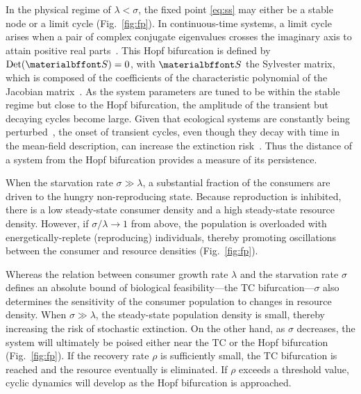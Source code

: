 \documentclass{pnastwo}
\begin{document}
\begin{article}
In the physical regime of $\lambda<\sigma$, the fixed point \eqref{eq:ss} may
either be a stable node or a limit cycle (Fig.~\ref{fig:fp}).  In
continuous-time systems, a limit cycle arises when a pair of complex
conjugate eigenvalues crosses the imaginary axis to attain positive real
parts~\cite{GuckHolmes}.  This Hopf bifurcation is defined by
${\rm Det}({\bf S}) = 0$, with $\bf S$ the Sylvester matrix, which is
composed of the coefficients of the characteristic polynomial of the Jacobian
matrix~\cite{Gross:2004p2428}.  As the system parameters are tuned to be
within the stable regime but close to the Hopf bifurcation, the amplitude of
the transient but decaying cycles become large.  Given that ecological
systems are constantly being perturbed~\cite{Hastings:2001jh}, the onset of
transient cycles, even though they decay with time in the mean-field
description, can increase the extinction
risk~\cite{Neubert:1997wk,Caswell:2005eo,Neubert:2009td}.  Thus the distance
of a system from the Hopf bifurcation provides a measure of its persistence.

When the starvation rate $\sigma\gg\lambda$, a substantial fraction of the
consumers are driven to the hungry non-reproducing state.  Because
reproduction is inhibited, there is a low steady-state consumer density and a
high steady-state resource density.  However, if $\sigma/\lambda\to 1$ from
above, the population is overloaded with energetically-replete (reproducing)
individuals, thereby promoting oscillations between the consumer and resource
densities (Fig.~\ref{fig:fp}).

Whereas the relation between consumer growth rate $\lambda$ and the
starvation rate $\sigma$ defines an absolute bound of biological
feasibility---the TC bifurcation---$\sigma$ also
determines the sensitivity of the consumer population to changes in resource
density.  When $\sigma\gg\lambda$, the steady-state population density is
small, thereby increasing the risk of stochastic extinction.  On the other
hand, as $\sigma$ decreases, the system will ultimately be poised either near
the TC or the Hopf bifurcation (Fig.~\ref{fig:fp}).  If the recovery rate
$\rho$ is sufficiently small, the TC bifurcation is reached and the resource
eventually is eliminated.  If $\rho$ exceeds a threshold value, cyclic
dynamics will develop as the Hopf bifurcation is approached.
\\


\end{article}
\end{document}
